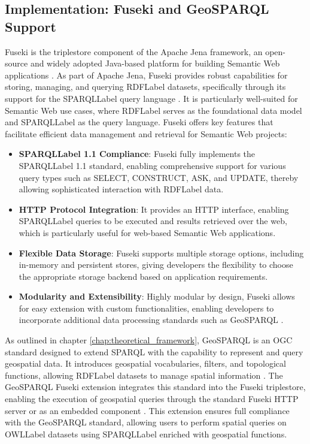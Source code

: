 \subsection{Implementation: Fuseki and GeoSPARQL Support}\label{VI-subsec:fuseki}

Fuseki is the triplestore component of the Apache Jena framework, an open-source and widely adopted Java-based platform for building Semantic Web applications \cite{ApacheJenaFramework}. As part of Apache Jena, Fuseki provides robust capabilities for storing, managing, and querying \acrshort{RDFLabel} datasets, specifically through its support for the \acrshort{SPARQLLabel} query language \cite{ApacheJenaFuseki}. It is particularly well-suited for Semantic Web use cases, where \acrshort{RDFLabel} serves as the foundational data model and \acrshort{SPARQLLabel} as the query language. Fuseki offers key features that facilitate efficient data management and retrieval for Semantic Web projects:

\begin{itemize}
    \item \textbf{\acrshort{SPARQLLabel} 1.1 Compliance}: Fuseki fully implements the \acrshort{SPARQLLabel} 1.1 standard, enabling comprehensive support for various query types such as SELECT, CONSTRUCT, ASK, and UPDATE, thereby allowing sophisticated interaction with \acrshort{RDFLabel} data.
    \item \textbf{HTTP Protocol Integration}: It provides an HTTP interface, enabling \acrshort{SPARQLLabel} queries to be executed and results retrieved over the web, which is particularly useful for web-based Semantic Web applications.
    \item \textbf{Flexible Data Storage}: Fuseki supports multiple storage options, including in-memory and persistent stores, giving developers the flexibility to choose the appropriate storage backend based on application requirements.
    \item \textbf{Modularity and Extensibility}: Highly modular by design, Fuseki allows for easy extension with custom functionalities, enabling developers to incorporate additional data processing standards such as GeoSPARQL \cite{GeoSPARQLFuseki}.
\end{itemize}

As outlined in chapter \ref{chap:theoretical_framework}, GeoSPARQL is an OGC standard designed to extend SPARQL with the capability to represent and query geospatial data. It introduces geospatial vocabularies, filters, and topological functions, allowing \acrshort{RDFLabel} datasets to manage spatial information \cite{matthewperryOGCGeoSPARQLGeographic2012}. The GeoSPARQL Fuseki extension integrates this standard into the Fuseki triplestore, enabling the execution of geospatial queries through the standard Fuseki HTTP server or as an embedded component \cite{GeoSPARQLFuseki}. This extension ensures full compliance with the GeoSPARQL standard, allowing users to perform spatial queries on \acrshort{OWLLabel} datasets using \acrshort{SPARQLLabel} enriched with geospatial functions. 

